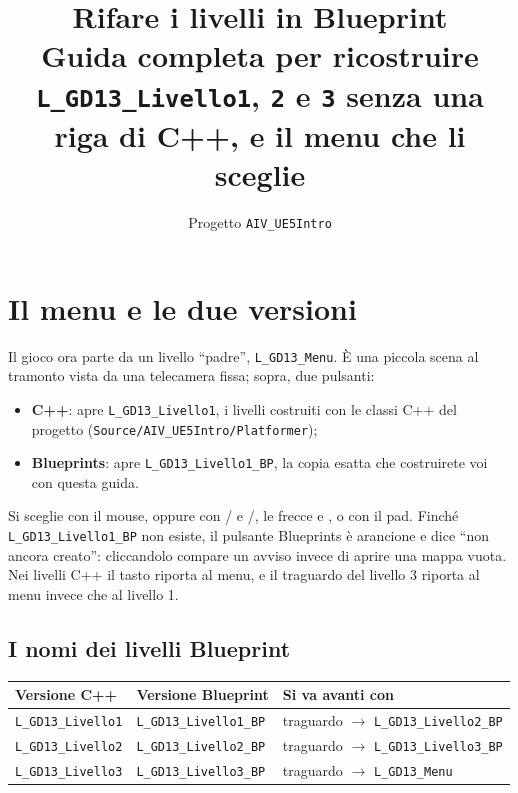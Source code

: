 \documentclass[a4paper,10pt]{article}
\title{\textbf{Rifare i livelli in Blueprint}\\[4pt]\large Guida completa per ricostruire \texttt{L\_GD13\_Livello1}, \texttt{2} e \texttt{3} senza una riga di C++, e il menu che li sceglie}
\author{Progetto \texttt{AIV\_UE5Intro}}
\date{}
\newcommand{\var}[1]{\texttt{#1}}
\newcommand{\tasto}[1]{\fbox{\footnotesize\textsf{#1}}}
\begin{document}
\maketitle
\tableofcontents
\newpage

\section{Il menu e le due versioni}

Il gioco ora parte da un livello ``padre'', \var{L\_GD13\_Menu}. È una piccola scena al tramonto vista da una telecamera fissa; sopra, due pulsanti:

\begin{itemize}
  \item \textbf{C++}: apre \var{L\_GD13\_Livello1}, i livelli costruiti con le classi C++ del progetto (\texttt{Source/AIV\_UE5Intro/Platformer});
  \item \textbf{Blueprints}: apre \var{L\_GD13\_Livello1\_BP}, la copia esatta che costruirete voi con questa guida.
\end{itemize}

Si sceglie con il mouse, oppure con \tasto{1}/\tasto{C} e \tasto{2}/\tasto{B}, le frecce e \tasto{Invio}, o con il pad. Finché \var{L\_GD13\_Livello1\_BP} non esiste, il pulsante Blueprints è arancione e dice ``non ancora creato'': cliccandolo compare un avviso invece di aprire una mappa vuota. Nei livelli C++ il tasto \tasto{M} riporta al menu, e il traguardo del livello 3 riporta al menu invece che al livello 1.

\subsection{I nomi dei livelli Blueprint}

\begin{center}
\begin{tabular}{lll}
\toprule
Versione C++ & Versione Blueprint & Si va avanti con \\
\midrule
\var{L\_GD13\_Livello1} & \var{L\_GD13\_Livello1\_BP} & traguardo $\rightarrow$ \var{L\_GD13\_Livello2\_BP} \\
\var{L\_GD13\_Livello2} & \var{L\_GD13\_Livello2\_BP} & traguardo $\rightarrow$ \var{L\_GD13\_Livello3\_BP} \\
\var{L\_GD13\_Livello3} & \var{L\_GD13\_Livello3\_BP} & traguardo $\rightarrow$ \var{L\_GD13\_Menu} \\
\bottomrule
\end{tabular}
\end{center}
\end{document}
